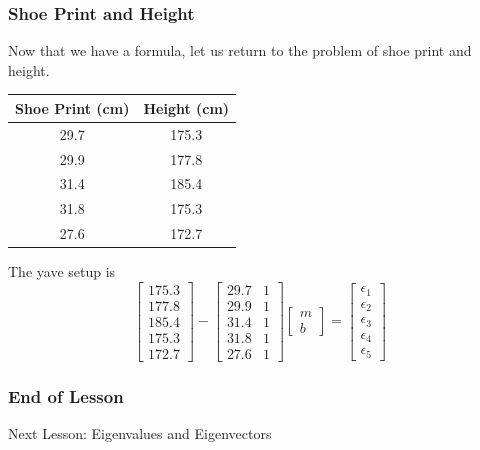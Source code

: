 \documentclass[xcolor=dvipsnames]{beamer}
\begin{document}
\begin{frame}
  \frametitle{Shoe Print and Height}
  Now that we have a formula, let us return to the problem of shoe
  print and height.

    \begin{tabular}{|c|c|}\hline
    Shoe Print (cm) & Height (cm) \\ \hline
    29.7 & 175.3 \\ \hline
    29.9 & 177.8 \\ \hline
    31.4 & 185.4 \\ \hline
    31.8 & 175.3 \\ \hline
    27.6 & 172.7 \\ \hline
  \end{tabular}

  The yave setup is
  \begin{equation}
    \label{eq:zeengaip}
    \left[
      \begin{array}{c}
    175.3 \\
    177.8 \\
    185.4 \\
    175.3 \\
    172.7 
      \end{array}\right]-\left[
      \begin{array}{cc}
    29.7 & 1 \\
    29.9 & 1 \\
    31.4 & 1 \\
    31.8 & 1 \\
    27.6 & 1
      \end{array}\right]\left[
      \begin{array}{c}
        m \\
        b
      \end{array}\right]=\left[
    \begin{array}{c}
      \epsilon_{1} \\
      \epsilon_{2} \\
      \epsilon_{3} \\
      \epsilon_{4} \\
      \epsilon_{5}
    \end{array}\right]
  \end{equation}
\end{frame}

\begin{frame}
  \frametitle{End of Lesson}
Next Lesson: Eigenvalues and Eigenvectors
\end{frame}
\end{document}

